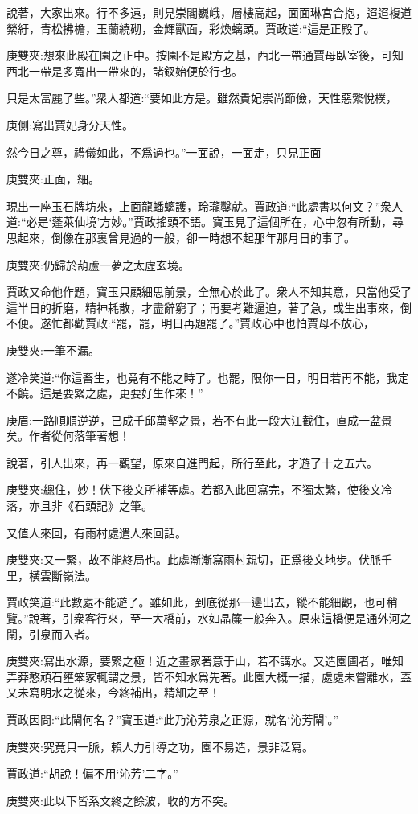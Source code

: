 \begin{parag}
    說著，大家出來。行不多遠，則見崇閣巍峨，層樓高起，面面琳宮合抱，迢迢複道縈紆，青松拂檐，玉蘭繞砌，金輝獸面，彩煥螭頭。賈政道:“這是正殿了。\begin{note}庚雙夾:想來此殿在園之正中。按園不是殿方之基，西北一帶通賈母臥室後，可知西北一帶是多寬出一帶來的，諸釵始便於行也。\end{note}只是太富麗了些。”衆人都道:“要如此方是。雖然貴妃崇尚節儉，天性惡繁悅樸，\begin{note}庚側:寫出賈妃身分天性。\end{note}然今日之尊，禮儀如此，不爲過也。”一面說，一面走，只見正面\begin{note}庚雙夾:正面，細。\end{note}現出一座玉石牌坊來，上面龍蟠螭護，玲瓏鑿就。賈政道:“此處書以何文？”衆人道:“必是‘蓬萊仙境’方妙。”賈政搖頭不語。寶玉見了這個所在，心中忽有所動，尋思起來，倒像在那裏曾見過的一般，卻一時想不起那年那月日的事了。\begin{note}庚雙夾:仍歸於葫蘆一夢之太虛玄境。\end{note}賈政又命他作題，寶玉只顧細思前景，全無心於此了。衆人不知其意，只當他受了這半日的折磨，精神耗散，才盡辭窮了；再要考難逼迫，著了急，或生出事來，倒不便。遂忙都勸賈政:“罷，罷，明日再題罷了。”賈政心中也怕賈母不放心，\begin{note}庚雙夾:一筆不漏。\end{note}遂冷笑道:“你這畜生，也竟有不能之時了。也罷，限你一日，明日若再不能，我定不饒。這是要緊之處，更要好生作來！”\begin{note}庚眉:一路順順逆逆，已成千邱萬壑之景，若不有此一段大江截住，直成一盆景矣。作者從何落筆著想！\end{note}
\end{parag}


\begin{parag}
    說著，引人出來，再一觀望，原來自進門起，所行至此，才遊了十之五六。\begin{note}庚雙夾:總住，妙！伏下後文所補等處。若都入此回寫完，不獨太繁，使後文冷落，亦且非《石頭記》之筆。\end{note}又值人來回，有雨村處遣人來回話。\begin{note}庚雙夾:又一緊，故不能終局也。此處漸漸寫雨村親切，正爲後文地步。伏脈千里，橫雲斷嶺法。\end{note}賈政笑道:“此數處不能遊了。雖如此，到底從那一邊出去，縱不能細觀，也可稍覽。”說著，引衆客行來，至一大橋前，水如晶簾一般奔入。原來這橋便是通外河之閘，引泉而入者。\begin{note}庚雙夾:寫出水源，要緊之極！近之畫家著意于山，若不講水。又造園圃者，唯知弄莽憨頑石壅笨冢輒謂之景，皆不知水爲先著。此園大概一描，處處未嘗離水，蓋又未寫明水之從來，今終補出，精細之至！\end{note}賈政因問:“此閘何名？”寶玉道:“此乃沁芳泉之正源，就名‘沁芳閘’。”\begin{note}庚雙夾:究竟只一脈，賴人力引導之功，園不易造，景非泛寫。\end{note}賈政道:“胡說！偏不用‘沁芳’二字。”\begin{note}庚雙夾:此以下皆系文終之餘波，收的方不突。\end{note}
\end{parag}


